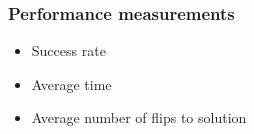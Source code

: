 \begin{frame}
\frametitle{Performance measurements}
\begin{itemize}
	\item Success rate
	\item Average time
	\item Average number of flips to solution \parencite{Singer2000}
\end{itemize}

\end{frame}
